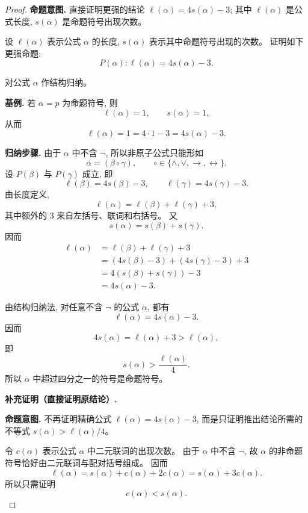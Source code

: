 \documentclass[a4paper, justified]{tufte-handout}
\newenvironment{intention}
  {\par\smallskip\noindent\textbf{命题意图. }\ignorespaces}
  {\par\smallskip}
\begin{document}
\begin{proof}
  \begin{intention}
    直接证明更强的结论
    $\ell(\alpha) = 4 s(\alpha) - 3$;
    其中 $\ell(\alpha)$ 是公式长度, $s(\alpha)$ 是命题符号出现次数。
  \end{intention}

  设 $\ell(\alpha)$ 表示公式 $\alpha$ 的长度,
  $s(\alpha)$ 表示其中命题符号出现的次数。
  证明如下更强命题:
  \[
    P(\alpha): \ell(\alpha) = 4 s(\alpha) - 3.
  \]

  对公式 $\alpha$ 作结构归纳。

  \textbf{基例.}
  若 $\alpha = p$ 为命题符号, 则
  \[
    \ell(\alpha) = 1, \qquad s(\alpha) = 1,
  \]
  从而
  \[
    \ell(\alpha) = 1 = 4 \cdot 1 - 3 = 4 s(\alpha) - 3.
  \]

  \textbf{归纳步骤.}
  由于 $\alpha$ 中不含 $\lnot$, 所以非原子公式只能形如
  \[
    \alpha = (\beta \circ \gamma),
    \qquad
    \circ \in \{\land, \lor, \to, \leftrightarrow\}.
  \]
  设 $P(\beta)$ 与 $P(\gamma)$ 成立, 即
  \[
    \ell(\beta) = 4 s(\beta) - 3,
    \qquad
    \ell(\gamma) = 4 s(\gamma) - 3.
  \]
  由长度定义,
  \[
    \ell(\alpha) = \ell(\beta) + \ell(\gamma) + 3,
  \]
  其中额外的 $3$ 来自左括号、联词和右括号。
  又
  \[
    s(\alpha) = s(\beta) + s(\gamma).
  \]
  因而
  \begin{align*}
    \ell(\alpha)
      &= \ell(\beta) + \ell(\gamma) + 3 \\
      &= (4 s(\beta) - 3) + (4 s(\gamma) - 3) + 3 \\
      &= 4 (s(\beta) + s(\gamma)) - 3 \\
      &= 4 s(\alpha) - 3.
  \end{align*}

  由结构归纳法, 对任意不含 $\lnot$ 的公式 $\alpha$,
  都有
  \[
    \ell(\alpha) = 4 s(\alpha) - 3.
  \]
  因而
  \[
    4 s(\alpha) = \ell(\alpha) + 3 > \ell(\alpha),
  \]
  即
  \[
    s(\alpha) > \frac{\ell(\alpha)}{4}.
  \]
  所以 $\alpha$ 中超过四分之一的符号是命题符号。

  \medskip
  \textbf{补充证明（直接证明原结论）.}

  \begin{intention}
    不再证明精确公式 $\ell(\alpha) = 4 s(\alpha) - 3$,
    而是只证明推出结论所需的不等式
    $s(\alpha) > \ell(\alpha)/4$。
  \end{intention}

  令 $c(\alpha)$ 表示公式 $\alpha$ 中二元联词的出现次数。
  由于 $\alpha$ 中不含 $\lnot$,
  故 $\alpha$ 的非命题符号恰好由二元联词与配对括号组成。
  因而
  \[
    \ell(\alpha) = s(\alpha) + c(\alpha) + 2 c(\alpha)
    = s(\alpha) + 3 c(\alpha).
  \]
  所以只需证明
  \[
    c(\alpha) < s(\alpha).
  \]


\end{proof}
\end{document}
